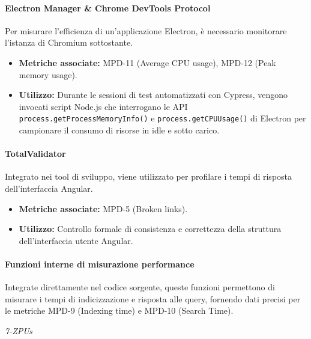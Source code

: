 \documentclass[a4paper,12pt]{article}
\begin{document}
\paragraph{Electron Manager \& Chrome DevTools Protocol}
Per misurare l'efficienza di un'applicazione Electron, è necessario monitorare l'istanza di Chromium sottostante.
\begin{itemize}
    \item \textbf{Metriche associate:} MPD-11 (Average CPU usage), MPD-12 (Peak memory usage).
    \item \textbf{Utilizzo:} Durante le sessioni di test automatizzati con Cypress, vengono invocati script Node.js che interrogano le API \texttt{process.getProcessMemoryInfo()} e \texttt{process.getCPUUsage()} di Electron per campionare il consumo di risorse in idle e sotto carico.
\end{itemize}

\paragraph{TotalValidator}
Integrato nei tool di sviluppo, viene utilizzato per profilare i tempi di risposta dell'interfaccia Angular.
\begin{itemize}
    \item \textbf{Metriche associate:} MPD-5 (Broken links).
    \item \textbf{Utilizzo:} Controllo formale di consistenza e correttezza della struttura dell'interfaccia utente Angular.
\end{itemize}

\paragraph{Funzioni interne di misurazione performance}
Integrate direttamente nel codice sorgente, queste funzioni permettono di misurare i tempi di indicizzazione e risposta alle query, fornendo dati precisi per le metriche MPD-9 (Indexing time) e MPD-10 (Search Time).



\vfill
\begin{flushright}
    \textit{7-ZPUs}
\end{flushright}
\end{document}
